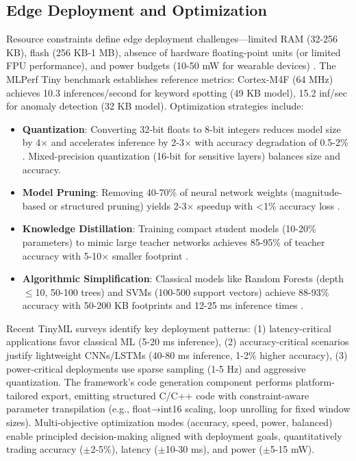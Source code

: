 \subsection{Edge Deployment and Optimization}
Resource constraints define edge deployment challenges---limited RAM (32-256 KB), flash (256 KB-1 MB), absence of hardware floating-point units (or limited FPU performance), and power budgets (10-50 mW for wearable devices) \cite{banbury2021mlperf, ray2023tinyml_survey}. The MLPerf Tiny benchmark \cite{banbury2021mlperf} establishes reference metrics: Cortex-M4F (64 MHz) achieves 10.3 inferences/second for keyword spotting (49 KB model), 15.2 inf/sec for anomaly detection (32 KB model). Optimization strategies include:
\begin{itemize}
    \item \textbf{Quantization}: Converting 32-bit floats to 8-bit integers reduces model size by 4$\times$ and accelerates inference by 2-3$\times$ with accuracy degradation of 0.5-2\% \cite{lin2022mcunet}. Mixed-precision quantization (16-bit for sensitive layers) balances size and accuracy.
    \item \textbf{Model Pruning}: Removing 40-70\% of neural network weights (magnitude-based or structured pruning) yields 2-3$\times$ speedup with <1\% accuracy loss \cite{schmidhuber2015deep}.
    \item \textbf{Knowledge Distillation}: Training compact student models (10-20\% parameters) to mimic large teacher networks achieves 85-95\% of teacher accuracy with 5-10$\times$ smaller footprint \cite{dutta2023tinyml_platforms}.
    \item \textbf{Algorithmic Simplification}: Classical models like Random Forests (depth $\leq$10, 50-100 trees) and SVMs (100-500 support vectors) achieve 88-93\% accuracy with 50-200 KB footprints and 12-25 ms inference times \cite{wang2024har_comparative}.
\end{itemize}
Recent TinyML surveys \cite{ray2023tinyml_survey, dutta2023tinyml_platforms} identify key deployment patterns: (1) latency-critical applications favor classical ML (5-20 ms inference), (2) accuracy-critical scenarios justify lightweight CNNs/LSTMs (40-80 ms inference, 1-2\% higher accuracy), (3) power-critical deployments use sparse sampling (1-5 Hz) and aggressive quantization. The framework's code generation component performs platform-tailored export, emitting structured C/C++ code with constraint-aware parameter transpilation (e.g., float→int16 scaling, loop unrolling for fixed window sizes). Multi-objective optimization modes (accuracy, speed, power, balanced) enable principled decision-making aligned with deployment goals, quantitatively trading accuracy ($\pm$2-5\%), latency ($\pm$10-30 ms), and power ($\pm$5-15 mW).

